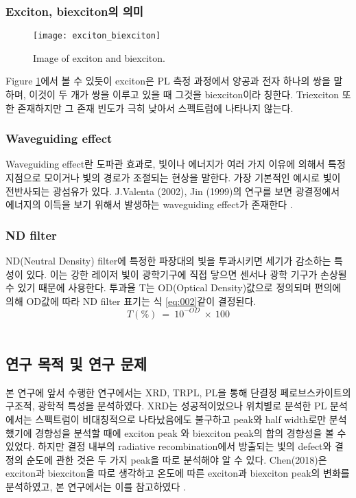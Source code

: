 \subsubsection{Exciton, biexciton의 의미}
\begin{figure}[H]
	\begin{center}
			\texttt{[image: exciton\_biexciton]}
	\end{center}
	\caption{Image of exciton and biexciton.}
	\label{fig:ex}  
\end{figure}
Figure \ref{fig:ex}에서 볼 수 있듯이 exciton은 PL 측정 과정에서 양공과 전자 하나의 쌍을 말하며, 이것이 두 개가 쌍을 이루고 있을 때 그것을 biexciton이라 칭한다. Triexciton 또한 존재하지만 그 존재 빈도가 극히 낮아서 스펙트럼에 나타나지 않는다. 
\\
\subsubsection{Waveguiding effect}
Waveguiding effect란 도파관 효과로, 빛이나 에너지가 여러 가지 이유에 의해서 특정 지점으로 모이거나 빛의 경로가 조절되는 현상을 말한다. 가장 기본적인 예시로 빛이 전반사되는 광섬유가 있다. J.Valenta (2002), Jin (1999)의 연구를 보면 광결정에서 에너지의 이득을 보기 위해서 발생하는 waveguiding effect가 존재한다\cite{valenta2002waveguiding} \cite{jin1999band}. 


\subsubsection{ND filter}
ND(Neutral Density) filter에 특정한 파장대의 빛을 투과시키면 세기가 감소하는 특성이 있다. 이는 강한 레이저 빛이 광학기구에 직접 닿으면 센서나 광학 기구가 손상될 수 있기 때문에 사용한다. 투과율 T는 OD(Optical Density)값으로 정의되며 편의에 의해 OD값에 따라 ND filter 표기는 식 \ref{eq:002}\와 같이 결정된다.
\begin{equation}
T(\%)~=~10^{-OD}~\times~100
\label{eq:002}
\end{equation}
\\
\subsection{연구 목적 및 연구 문제}
본 연구에 앞서 수행한 연구에서는 XRD, TRPL, PL을 통해 단결정 페로브스카이트의 구조적, 광학적 특성을 분석하였다. XRD는 성공적이었으나 위치별로 분석한 PL 분석에서는 스펙트럼이 비대칭적으로 나타났음에도 불구하고 peak와 half width로만 분석했기에 경향성을 분석할 때에 exciton peak 와 biexciton peak의 합의 경향성을 볼 수 있었다. 하지만 결정 내부의 radiative recombination에서 방출되는 빛의 defect와 결정의 순도에 관한 것은 두 가지 peak을 따로 분석해야 알 수 있다. Chen(2018)은 exciton과 biexciton을 따로 생각하고 온도에 따른 exciton과 biexciton peak의 변화를 분석하였고, 본 연구에서는 이를 참고하였다 \cite{chen2018room}. 

